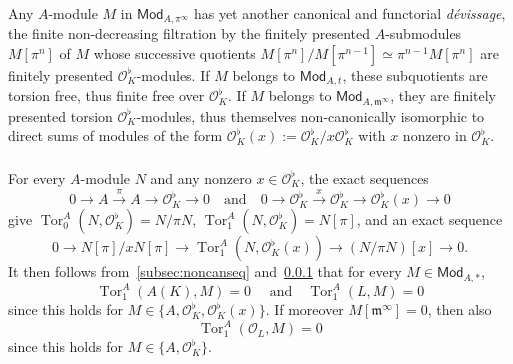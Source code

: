 \documentclass[11pt]{article}
\theoremstyle{definition}
\numberwithin{equation}{section}
\numberwithin{figure}{section}
\numberwithin{table}{section}
\newcommand{\Mod}{\mathsf{Mod}}
\DeclareMathOperator{\Tor}{Tor}
\begin{document}
\subsubsection{}\label{subsec:FiltOnModAt=000026ModAm}

Any $A$-module $M$ in $\Mod_{A,\pi^{\infty}}$ has yet another canonical and functorial \emph{d\'evissage}, the finite non-decreasing filtration by the finitely presented $A$-submodules $M[\pi^{n}]$ of $M$ whose successive quotients $M[\pi^{n}]/M[\pi^{n-1}]\simeq\pi^{n-1}M[\pi^{n}]$ are finitely presented $\mathcal{O}_{K}^{\flat}$-modules. If $M$ belongs to $\Mod_{A,t}$, these subquotients are torsion free, thus finite free over $\mathcal{O}_{K}^{\flat}$. If $M$ belongs to $\Mod_{A,\mathfrak{m}^{\infty}}$, they are finitely presented torsion $\mathcal{O}_{K}^{\flat}$-modules, thus themselves non-canonically isomorphic to direct sums of modules of the form $\mathcal{O}_{K}^{\flat}(x):=\mathcal{O}_{K}^{\flat}/x\mathcal{O}_{K}^{\flat}$ with $x$ nonzero in $\mathcal{O}_{K}^{\flat}$.

\subsubsection{}\label{subsec:Tor(A(K)LO_L)}


For every $A$-module $N$ and any nonzero $x\in\mathcal{O}_{K}^{\flat}$, the exact sequences
\[
0\rightarrow A\stackrel{\pi}{\rightarrow}A\rightarrow\mathcal{O}_{K}^{\flat}\rightarrow0\quad\text{and}\quad0\rightarrow\mathcal{O}_{K}^{\flat}\stackrel{x}{\rightarrow}\mathcal{O}_{K}^{\flat}\rightarrow\mathcal{O}_{K}^{\flat}(x)\rightarrow0
\]
give $\Tor_{0}^{A}(N,\mathcal{O}_{K}^{\flat})=N/\pi N$, $\Tor_{1}^{A}(N,\mathcal{O}_{K}^{\flat})=N[\pi]$, and an exact sequence
\[
0\rightarrow N[\pi]/xN[\pi]\rightarrow\Tor_{1}^{A}(N,\mathcal{O}_{K}^{\flat}(x))\rightarrow(N/\pi N)[x]\rightarrow0.
\]
It then follows from~\ref{subsec:noncanseq} and~\ref{subsec:FiltOnModAt=000026ModAm} that for every $M\in\Mod_{A,\ast}$,
\[
\Tor_{1}^{A}(A(K),M)=0\quad\text{ and}\quad\Tor_{1}^{A}(L,M)=0
\]
since this holds for $M\in\{A,\mathcal{O}_{K}^{\flat},\mathcal{O}_{K}^{\flat}(x)\}$. If moreover $M[\mathfrak{m}^{\infty}]=0$, then also
\[
\Tor_{1}^{A}(\mathcal{O}_{L},M)=0
\]
since this holds for $M\in\{A,\mathcal{O}_{K}^{\flat}\}$.

\subsubsection{}
\end{document}
